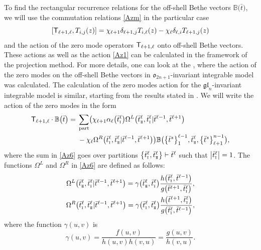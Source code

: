 \documentclass[pdftex]{sigma}
\newcommand{\so}{\scriptscriptstyle \rm I}
\newcommand{\st}{\scriptscriptstyle \rm I\hspace{-1pt}I}
\newcommand{\bt}{{\bar t}}
\theoremstyle{definition}
\def\BB{{\mathbb{B}}}
\def\r#1{\eqref{#1}}
\def\sT{{\sf T}}
\def\vk{\chi}
\def\Oml{\Omega^L}
\def\Omr{\Omega^R}
\begin{document}
To find the rectangular recurrence relations for the off-shell Bethe vectors
$\BB\bigl(\bt\bigr)$, we will use the commutation relations \r{Azm} in the particular case
\begin{equation}\label{Az5}
[\sT_{\ell+1,\ell},T_{i,j}(z)]=\vk_{\ell+1} \delta_{\ell+1,j} T_{i,\ell}(z)-
\vk_{\ell} \delta_{\ell,i} T_{\ell+1,j}(z)
\end{equation}
and the action of the zero mode operators $\sT_{\ell+1,\ell}$ onto off-shell Bethe vectors.
These actions as well as the action \r{Az1} can be calculated in the framework of the
projection method. For more details, one can look at the \cite[Section~4.1]{LP2},
where the action of the zero modes on the off-shell Bethe vectors
in $\mathfrak{o}_{2n+1}$-invariant integrable model was calculated.
The calculation of the zero modes action for
the $\mathfrak{gl}_{n}$-invariant integrable model is similar, starting from the results stated in \cite{HLPRS17}.
We will write the action of the zero modes in the form
\begin{align}
\sT_{\ell+1,\ell}\cdot\BB\bigl(\bt\bigr) ={}&\sum_{\rm part}\bigl(\vk_{\ell+1}
\alpha_\ell\bigl(\bt^\ell_{\so}\bigr) \Oml\bigl(\bt^\ell_{\st},\bt^\ell_{\so}|\bt^{\ell-1},\bt^{\ell+1}\bigr)\nonumber\\
&- \vk_\ell \Omr\bigl(\bt^\ell_{\so},\bt^\ell_{\st}|\bt^{\ell-1},\bt^{\ell+1}\bigr)\bigr)
\BB\bigl(\bigl\{\bt^s\bigr\}_{1}^{\ell-1},\bt^\ell_{\st},\bigl\{\bt^s\bigr\}_{\ell+1}^{n-1}\bigr) ,\label{Az6}
\end{align}
where the sum in \r{Az6} goes over
partitions $ \bigl\{\bt^\ell_{\so},\bt^\ell_{\st}\bigr\}\vdash \bt^\ell$ such that
$\big|\bt^\ell_{\so}\big|=1$.
The functions $\Oml$ and $\Omr$ in \r{Az6}
are defined as follows:
\begin{gather}
\Oml\bigl(\bt^\ell_{\st},\bt^\ell_{\so}|\bt^{\ell-1},\bt^{\ell+1}\bigr)=\gamma\bigl(\bt^\ell_{\st},\bt^\ell_{\so}\bigr)
 \frac{h\bigl(\bt^\ell_{\so},\bt^{\ell-1}\bigr)}{g\bigl(\bt^{\ell+1},\bt^\ell_{\so}\bigr)},\nonumber\\
\Omr\bigl(\bt^\ell_{\so},\bt^\ell_{\st}|\bt^{\ell-1},\bt^{\ell+1}\bigr)=
\gamma\bigl(\bt^\ell_{\so},\bt^\ell_{\st}\bigr)
 \frac{h\bigl(\bt^{\ell+1},\bt^\ell_{\so}\bigr)}{g\bigl(\bt^\ell_{\so},\bt^{\ell-1}\bigr)} ,\label{Az7}
\end{gather}
where the function $\gamma(u,v)$ is
\begin{equation*}
\gamma(u,v)=\frac{f(u,v)}{h(u,v)h(v,u)}=\frac{g(u,v)}{h(v,u)} .
\end{equation*}
\end{document}
